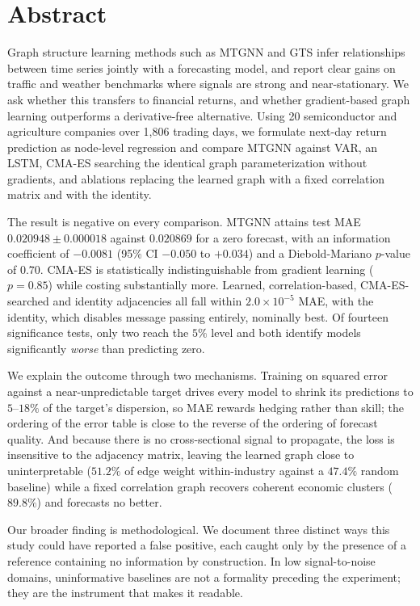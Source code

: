 \section*{Abstract}

Graph structure learning methods such as MTGNN and GTS infer relationships between time series jointly with a forecasting model, and report clear gains on traffic and weather benchmarks where signals are strong and near-stationary. We ask whether this transfers to financial returns, and whether gradient-based graph learning outperforms a derivative-free alternative. Using 20 semiconductor and agriculture companies over 1{,}806 trading days, we formulate next-day return prediction as node-level regression and compare MTGNN against VAR, an LSTM, CMA-ES searching the identical graph parameterization without gradients, and ablations replacing the learned graph with a fixed correlation matrix and with the identity.

The result is negative on every comparison. MTGNN attains test MAE $0.020948 \pm 0.000018$ against $0.020869$ for a zero forecast, with an information coefficient of $-0.0081$ (95\% CI $-0.050$ to $+0.034$) and a Diebold-Mariano $p$-value of $0.70$. CMA-ES is statistically indistinguishable from gradient learning ($p = 0.85$) while costing substantially more. Learned, correlation-based, CMA-ES-searched and identity adjacencies all fall within $2.0 \times 10^{-5}$ MAE, with the identity, which disables message passing entirely, nominally best. Of fourteen significance tests, only two reach the $5\%$ level and both identify models significantly \emph{worse} than predicting zero.

We explain the outcome through two mechanisms. Training on squared error against a near-unpredictable target drives every model to shrink its predictions to $5$--$18\%$ of the target's dispersion, so MAE rewards hedging rather than skill; the ordering of the error table is close to the reverse of the ordering of forecast quality. And because there is no cross-sectional signal to propagate, the loss is insensitive to the adjacency matrix, leaving the learned graph close to uninterpretable ($51.2\%$ of edge weight within-industry against a $47.4\%$ random baseline) while a fixed correlation graph recovers coherent economic clusters ($89.8\%$) and forecasts no better.

Our broader finding is methodological. We document three distinct ways this study could have reported a false positive, each caught only by the presence of a reference containing no information by construction. In low signal-to-noise domains, uninformative baselines are not a formality preceding the experiment; they are the instrument that makes it readable.
